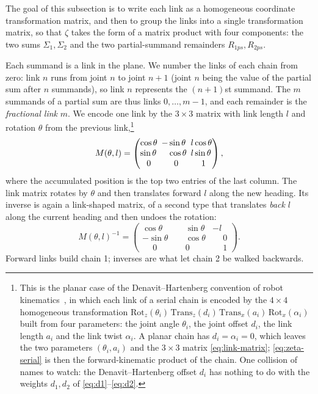 \documentclass[11pt]{article}
\makeatletter
\theoremstyle{definition}
\newcommand{\linkmat}[2]{%
\left(\begin{array}{@{}l@{\ \,}l@{\ \,}l@{}}
\cos #1 & -\sin #1           & #2\cos #1\\
\sin #1 & \phantom{-}\cos #1 & #2\sin #1\\
\multicolumn{1}{@{}c@{\ \,}}{0} & \multicolumn{1}{c@{\ \,}}{0} & \multicolumn{1}{c@{}}{1}
\end{array}\right)}
\makeatother
\begin{document}
The goal of this subsection is to write each link
as a homogeneous coordinate transformation matrix, and then to group the
links into a single transformation matrix, so that $\zeta$ takes the form
of a matrix product with four components: the two sums $\Sigma_1,\Sigma_2$
and the two partial-summand remainders $R_{1ps},R_{2ps}$.

Each summand is a link in the plane. We number the
links of each chain from zero: link $n$ runs from joint $n$ to joint $n+1$
(joint $n$ being the value of the partial sum after $n$ summands), so link $n$
represents the $(n+1)$st summand. The $m$ summands of a partial sum are thus
links $0,\dots,m-1$, and each remainder is the \emph{fractional link} $m$. We
encode one link by the $3\times3$ matrix with link length $l$ and rotation
$\theta$ from the previous link,\footnote{This is the planar case of the
Denavit--Hartenberg convention of robot kinematics~\cite{DenavitHartenberg1955},
in which each link of a serial chain is encoded by the $4\times4$ homogeneous
transformation
$\mathrm{Rot}_z(\theta_i)\,\mathrm{Trans}_z(d_i)\,\mathrm{Trans}_x(a_i)\,
\mathrm{Rot}_x(\alpha_i)$
built from four parameters: the joint angle $\theta_i$, the joint offset $d_i$,
the link length $a_i$ and the link twist $\alpha_i$. A planar chain has
$d_i=\alpha_i=0$, which leaves the two parameters $(\theta_i,a_i)$ and the
$3\times3$ matrix \eqref{eq:link-matrix}; \eqref{eq:zeta-serial} is then the
forward-kinematic product of the chain. One collision of names to watch: the
Denavit--Hartenberg offset $d_i$ has nothing to do with the weights $d_1,d_2$ of
\eqref{eq:d1}--\eqref{eq:d2}.}
\begin{equation}\label{eq:link-matrix}
M(\theta,l)=\linkmat{\theta}{l},
\end{equation}
where the accumulated position is the top two entries of the last column.
The link matrix rotates by $\theta$ and then translates forward $l$
along the new heading. Its inverse is again a link-shaped matrix, of a
second type that translates \emph{back} $l$ along the current heading and
then undoes the rotation:
\begin{equation}\label{eq:link-matrix-2}
M(\theta,l)^{-1}=
\begin{pmatrix}
\cos\theta & \phantom{-}\sin\theta & -l\\
-\sin\theta & \phantom{-}\cos\theta & \phantom{-}0\\
\phantom{-}0 & \phantom{-}0 & \phantom{-}1
\end{pmatrix}.
\end{equation}
Forward links build chain 1; inverses are what let chain 2 be walked
backwards.
\end{document}
